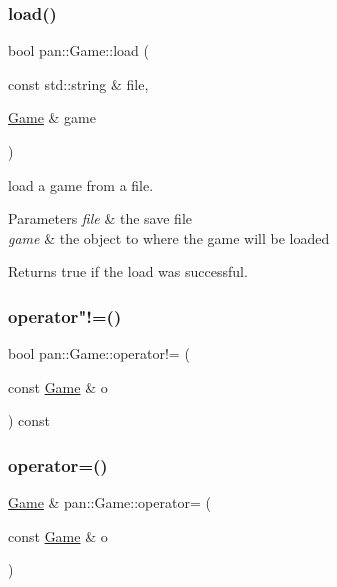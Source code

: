 \subsubsection{\texorpdfstring{load()}{load()}}
{\footnotesize\ttfamily bool pan\+::\+Game\+::load (\begin{DoxyParamCaption}\item[{const std\+::string \&}]{file,  }\item[{\hyperlink{classpan_1_1_game}{Game} \&}]{game }\end{DoxyParamCaption})\hspace{0.3cm}{\ttfamily [static]}}

load a game from a file. 
\begin{DoxyParams}{Parameters}
{\em file} & the save file \\
\hline
{\em game} & the object to where the game will be loaded \\
\hline
\end{DoxyParams}
\begin{DoxyReturn}{Returns}
true if the load was successful. 
\end{DoxyReturn}
\mbox{\label{classpan_1_1_game_a5316baca3fd1487c80759343b0df574a}} 
\subsubsection{\texorpdfstring{operator"!=()}{operator!=()}}
{\footnotesize\ttfamily bool pan\+::\+Game\+::operator!= (\begin{DoxyParamCaption}\item[{const \hyperlink{classpan_1_1_game}{Game} \&}]{o }\end{DoxyParamCaption}) const\hspace{0.3cm}{\ttfamily [inline]}}

\mbox{\label{classpan_1_1_game_a269b24bc583d51e598d22f93232c2f6a}} 
\subsubsection{\texorpdfstring{operator=()}{operator=()}\hspace{0.1cm}{\footnotesize\ttfamily [1/2]}}
{\footnotesize\ttfamily \hyperlink{classpan_1_1_game}{Game} \& pan\+::\+Game\+::operator= (\begin{DoxyParamCaption}\item[{const \hyperlink{classpan_1_1_game}{Game} \&}]{o }\end{DoxyParamCaption})}

